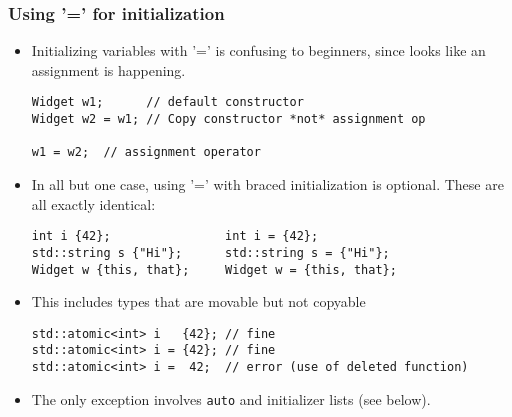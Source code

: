 \begin{frame}[fragile,t]
\frametitle{Using '=' for initialization}
\begin{itemize}[<+->]
\item Initializing variables with '=' is confusing to beginners, since looks
like an assignment is happening.
{\scriptsize\begin{verbatim}
Widget w1;      // default constructor
Widget w2 = w1; // Copy constructor *not* assignment op

w1 = w2;  // assignment operator
\end{verbatim}}
\item In all but one case, using '=' with braced initialization is
  optional.  These are all exactly identical:
{\scriptsize\begin{verbatim}
int i {42};                int i = {42};
std::string s {"Hi"};      std::string s = {"Hi"};
Widget w {this, that};     Widget w = {this, that};
\end{verbatim}}
\item This includes types that are movable but not copyable
{\scriptsize\begin{verbatim}
std::atomic<int> i   {42}; // fine
std::atomic<int> i = {42}; // fine
std::atomic<int> i =  42;  // error (use of deleted function)
\end{verbatim}}
\item The only exception involves \texttt{auto} and initializer lists
  (see below).
\end{itemize}
\end{frame}



